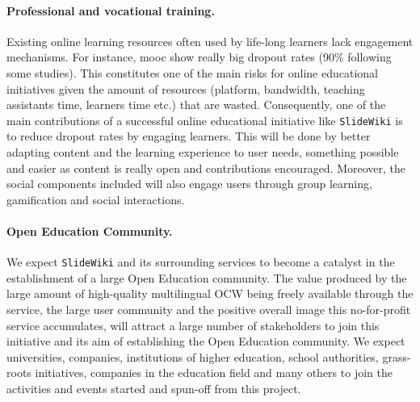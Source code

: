 \documentclass[PhD, Submit, ngerman,UKenglish,table]{scrbook}
\begin{document}
\paragraph{Professional and vocational training.}
Existing online learning resources often used by life-long learners lack engagement mechanisms.
For instance, \gls{mooc} show really big dropout rates (90\% following some studies).
This constitutes one of the main risks for online educational initiatives given the amount of resources (platform, bandwidth, teaching assistants time, learners time etc.) that are wasted.
Consequently, one of the main contributions of a successful online educational initiative like \texttt{SlideWiki} is to reduce dropout rates by engaging learners.
This will be done by better adapting content and the learning experience to user needs, something possible and easier as content is really open and contributions encouraged.
Moreover, the social components included will also engage users through group learning, gamification and social interactions.

\paragraph{Open Education Community.}
We expect \texttt{SlideWiki} and its surrounding services to become a catalyst in the establishment of a large Open Education community.
The value produced by the large amount of high-quality multilingual OCW being freely available through the service, the large user community and the positive overall image this no-for-profit service accumulates, will attract a large number of stakeholders to join this initiative and its aim of establishing the Open Education community.
We expect universities, companies, institutions of higher education, school authorities, grass-roots initiatives, companies in the education field and many others to join the activities and events started and spun-off from this project.

\appendix



\backmatter

 {\raggedright
   

   
}

\listoffigures
\listoftables


\printglossaries

%

\end{document}

